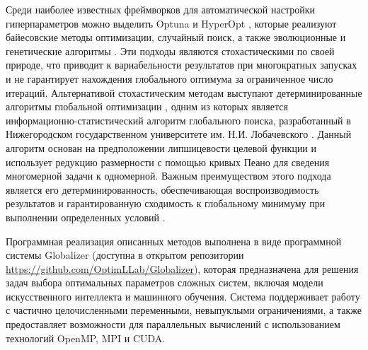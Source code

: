 \documentclass[11pt, oneside, a4paper]{article}
\begin{document}
Среди наиболее известных фреймворков для автоматической настройки гиперпараметров можно выделить Optuna \cite{optuna} и HyperOpt \cite{hyperopt}, которые реализуют байесовские методы оптимизации, случайный поиск, а также эволюционные и генетические алгоритмы \cite{Yang2013,Gendreau2010,Eiben2015}. Эти подходы являются стохастическими по своей природе, что приводит к вариабельности результатов при многократных запусках и не гарантирует нахождения глобального оптимума за ограниченное число итераций. Альтернативой стохастическим методам выступают детерминированные алгоритмы глобальной оптимизации \cite{Kvasov2018,Sergeyev2006,Zilinskas2008}, одним из которых является информационно-статистический алгоритм глобального поиска, разработанный в Нижегородском государственном университете им. Н.И. Лобачевского \cite{Strongin2000, Strongin2018}. Данный алгоритм основан на предположении липшицевости целевой функции и использует редукцию размерности с помощью кривых Пеано для сведения многомерной задачи к одномерной. Важным преимуществом этого подхода является его детерминированность, обеспечивающая воспроизводимость результатов и гарантированную сходимость к глобальному минимуму при выполнении определенных условий \cite{Strongin2000}.

Программная реализация описанных методов выполнена в виде программной системы Globalizer (доступна в открытом репозитории \url{https://github.com/OptimLLab/Globalizer}), которая предназначена для решения задач выбора оптимальных параметров сложных систем, включая модели искусственного интеллекта и машинного обучения. Система поддерживает работу с частично целочисленными переменными, невыпуклыми ограничениями, а также предоставляет возможности для параллельных вычислений с использованием технологий OpenMP, MPI и CUDA.
\end{document}
